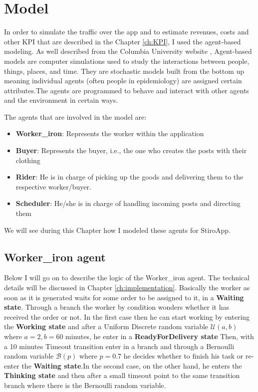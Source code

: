 \chapter{Model}\label{ch:model}
In order to simulate the traffic over the app and to estimate revenues, costs and other KPI that are described in the Chapter \ref{ch:KPI}, I used the agent-based modeling.
As well described from the Columbia University website \cite{columbia}, Agent-based models are computer simulations used to study the interactions between people, things, places, and time. They are stochastic models built from the bottom up meaning individual agents (often people in epidemiology) are assigned certain attributes.The agents are programmed to behave and interact with other agents and the environment in certain ways. \par
The agents that are involved in the model are:
\begin{itemize}
\item \textbf{Worker\_iron}: Represents the worker within the application
\item \textbf{Buyer}: Represents the buyer, i.e., the one who creates the posts with their clothing
\item \textbf{Rider}: He is in charge of picking up the goods and delivering them to the respective worker/buyer.
\item \textbf{Scheduler}: He/she is in charge of handling incoming posts and directing them
\end{itemize}
We will see during this Chapter how I modeled these agents for StiroApp.
\section{Worker\_iron agent}
Below I will go on to describe the logic of the Worker\_iron agent. The technical details will be discussed in Chapter \ref{ch:implementation}.
Basically the worker as soon as it is generated waits for some order to be assigned to it, in a \textbf{Waiting state}. 
Through a branch the worker by condition wonders whether it has received the order or not. In the first case then he can start working by entering the \textbf{Working state} and after a Uniform Discrete random variable $\mathcal{U}(a,b)$ where $a = 2, b = 60$ minutes, he enter in a \textbf{ReadyForDelivery state} Then, with a 10 minutes Timeout transition enter in a branch and through a Bernoulli random variable $\mathcal{B}(p)$ where $p = 0.7$ he decides whether to finish his task or re-enter the \textbf{Waiting state}.In the second case, on the other hand, he enters the \textbf{Thinking state} and then after a small timeout point to the same transition branch where there is the Bernoulli random variable.
